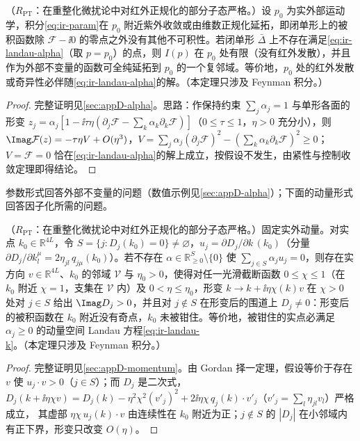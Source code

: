 \begin{theorem}\label{thm:ir-landau-alpha}
（$R_{\mathrm{PT}}$：在重整化微扰论中对红外正规化的部分子态严格。）设 $p_0$ 为实外部运动学，积分\cref{eq:ir-param}在 $p_0$ 附近紫外收敛或由维数正规化延拓，即闭单形上的被积函数除 $\mathcal F-\ii0$ 的零点之外没有其他不可积性。若闭单形 $\bar\Delta$ 上不存在满足\cref{eq:ir-landau-alpha}（取 $p=p_0$）的点，则 $I(p)$ 在 $p_0$ 处有限（没有红外发散），并且作为外部不变量的函数可全纯延拓到 $p_0$ 的一个复邻域。等价地，$p_0$ 处的红外发散或奇异性必伴随\cref{eq:ir-landau-alpha}的解。（本定理只涉及 Feynman 积分。）
\end{theorem}
\begin{proof}
完整证明见\cref{sec:appD-alpha}。思路：作保持约束 $\sum_j\alpha_j=1$ 与单形各面的形变 $z_j=\alpha_j[1-\ii\tau\eta(\partial_j\mathcal F-\sum_k\alpha_k\partial_k\mathcal F)]$（$0\le\tau\le1$，$\eta>0$ 充分小），则 $\Imag\mathcal F(z)=-\tau\eta V+O(\eta^3)$，$V=\sum_j\alpha_j(\partial_j\mathcal F)^2-(\sum_k\alpha_k\partial_k\mathcal F)^2\ge0$；$V=\mathcal F=0$ 恰在\cref{eq:ir-landau-alpha}的解上成立，按假设不发生，由紧性与控制收敛定理即得结论。
\end{proof}

参数形式回答外部不变量的问题（数值示例见\cref{sec:appD-alpha}）；下面的动量形式回答因子化所需的问题。

\begin{theorem}\label{thm:ir-landau-momentum}
（$R_{\mathrm{PT}}$：在重整化微扰论中对红外正规化的部分子态严格。）固定实外动量。对实点 $k_0\in\mathbb R^{4L}$，令 $S=\{j:D_j(k_0)=0\}\ne\varnothing$，$u_j=\partial D_j/\partial k\,(k_0)$（分量 $\partial D_j/\partial k_l^\mu=2\eta_{jl}\,q_{j\mu}(k_0)$）。若不存在 $\alpha\in\mathbb R^S_{\ge0}\setminus\{0\}$ 使 $\sum_{j\in S}\alpha_ju_j=0$，则存在实方向 $v\in\mathbb R^{4L}$、$k_0$ 的邻域 $\mathcal V$ 与 $\eta_0>0$，使得对任一光滑截断函数 $0\le\chi\le1$（在 $k_0$ 附近 $\chi=1$，支集在 $\mathcal V$ 内）及 $0<\eta\le\eta_0$，形变 $k\to k+\ii\eta\chi(k)v$ 在 $\chi>0$ 处对 $j\in S$ 给出 $\Imag D_j>0$，并且对 $j\notin S$ 在形变后的围道上 $D_j\ne0$：形变后的被积函数在 $k_0$ 附近没有奇点，$k_0$ 未被钳住。等价地，被钳住的实点必满足 $\alpha_j\ge0$ 的动量空间 Landau 方程\cref{eq:ir-landau-k}。（本定理只涉及 Feynman 积分。）
\end{theorem}
\begin{proof}
完整证明见\cref{sec:appD-momentum}。由 Gordan 择一定理，假设等价于存在 $v$ 使 $u_j\cdot v>0$（$j\in S$）；而 $D_j$ 是二次式，
$D_j(k+\ii\eta\chi v)=D_j(k)-\eta^2\chi^2(v'_j)^2+2\ii\eta\chi\,q_j(k)\cdot v'_j$（$v'_j=\sum_l\eta_{jl}v_l$）严格成立，
其虚部 $\eta\chi\,u_j(k)\cdot v$ 由连续性在 $k_0$ 附近为正；$j\notin S$ 的 $|D_j|$ 在小邻域内有正下界，形变只改变 $O(\eta)$。
\end{proof}


